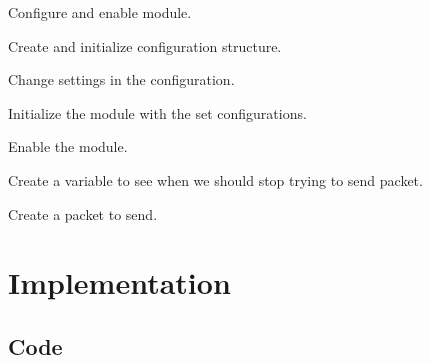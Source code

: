 \begin{DoxyEnumerate}
\item Configure and enable module. 
\begin{DoxyCodeInclude}{0}
\end{DoxyCodeInclude}

\begin{DoxyEnumerate}
\item Create and initialize configuration structure. 
\begin{DoxyCodeInclude}{0}
\end{DoxyCodeInclude}

\item Change settings in the configuration. 
\begin{DoxyCodeInclude}{0}
\end{DoxyCodeInclude}

\item Initialize the module with the set configurations. 
\begin{DoxyCodeInclude}{0}
\end{DoxyCodeInclude}

\item Enable the module. 
\begin{DoxyCodeInclude}{0}
\end{DoxyCodeInclude}

\end{DoxyEnumerate}
\item Create a variable to see when we should stop trying to send packet. 
\begin{DoxyCodeInclude}{0}
\end{DoxyCodeInclude}

\item Create a packet to send. 
\begin{DoxyCodeInclude}{0}
\end{DoxyCodeInclude}
 
\end{DoxyEnumerate}\hypertarget{asfdoc_sam0_sercom_i2c_master_basic_use_case_asfdoc_sam0_sercom_i2c_master_basic_use_implemenation}{}\section{Implementation}\label{asfdoc_sam0_sercom_i2c_master_basic_use_case_asfdoc_sam0_sercom_i2c_master_basic_use_implemenation}
\hypertarget{asfdoc_sam0_sercom_i2c_master_basic_use_case_asfdoc_sam0_sercom_i2c_master_basic_use_implemenation_code}{}\subsection{Code}\label{asfdoc_sam0_sercom_i2c_master_basic_use_case_asfdoc_sam0_sercom_i2c_master_basic_use_implemenation_code}
